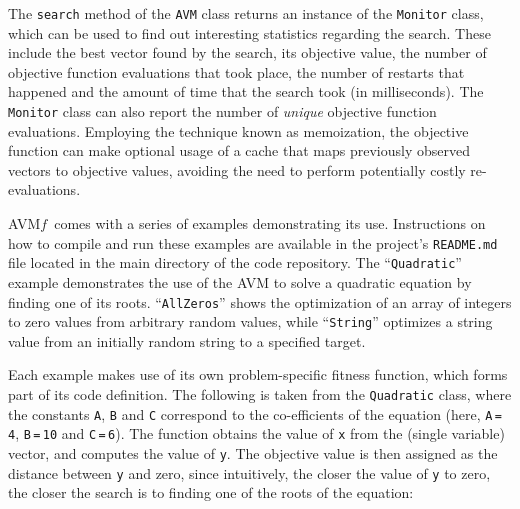 \documentclass{llncs}
\newcommand{\AVM}{Alternating Variable Method\xspace}
\newcommand{\name}{\mbox{AVM\hspace{-1pt}$f$}\xspace}
\newcommand{\inlineheading}[1]{\vspace{1mm} \noindent {\bf #1.}}
\begin{document}

\begin{sloppypar} \inlineheading{Reporting} The {\tt search} method of the {\tt AVM} class returns an instance of the {\tt Monitor} class, which can be used to find out interesting statistics regarding the search. These include the best vector found by the search, its objective value, the number of objective function evaluations that took place, the number of restarts that happened and the amount of time that the search took (in milliseconds). The {\tt Monitor} class can also report the number of {\it unique\/} objective function evaluations. Employing the technique known as memoization, the objective function can make optional usage of a cache that maps previously observed vectors to objective values, avoiding the need to perform potentially costly re-evaluations.
\end{sloppypar}

\begin{sloppypar} \inlineheading{Examples} \name~comes with a series of examples demonstrating its use. Instructions on how to compile and run these examples are available in the project's {\tt README.md} file located in the main directory of the code repository. The ``{\tt Quadratic}'' example demonstrates the use of the AVM to solve a quadratic equation by finding one of its roots. ``{\tt AllZeros}'' shows the optimization of an array of integers to zero values from arbitrary random values, while ``{\tt String}'' optimizes a string value from an initially random string to a specified target.
\end{sloppypar}


Each example makes use of its own problem-specific fitness function, which forms part of its code definition. The following is taken from the {\tt Quadratic} class, where the constants {\tt A}, {\tt B} and {\tt C} correspond to the co-efficients of the equation (here, {\tt A}\,{\tt =}\,{\tt 4}, {\tt B}\,{\tt =}\,{\tt 10} and {\tt C}\,{\tt =}\,{\tt 6}). The function obtains the value of {\tt x} from the (single variable) vector, and computes the value of {\tt y}. The objective value is then assigned as the distance between {\tt y} and zero, since intuitively, the closer the value of {\tt y} to zero, the closer the search is to finding one of the roots of the equation:
\end{document}
